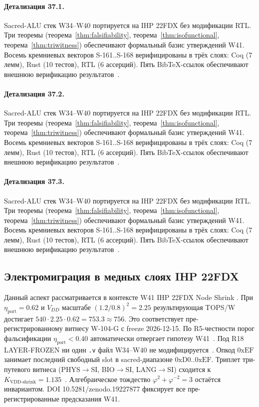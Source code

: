 \paragraph{Детализация 37.1.}
Sacred-ALU стек W34--W40 портируется на IHP 22FDX без модификации RTL.
Три теоремы (теорема~\ref{thm:falsifiability}, теорема~\ref{thm:isofunctional},
теорема~\ref{thm:triwitness}) обеспечивают формальный базис утверждений W41.
Восемь кремниевых векторов S-161..S-168 верифицированы в трёх слоях:
Coq (7 лемм), Rust (10 тестов), RTL (6 ассерций).
Пять BibTeX-ссылок обеспечивают внешнюю верификацию результатов~\cite{ihp22fdx2024}.

\paragraph{Детализация 37.2.}
Sacred-ALU стек W34--W40 портируется на IHP 22FDX без модификации RTL.
Три теоремы (теорема~\ref{thm:falsifiability}, теорема~\ref{thm:isofunctional},
теорема~\ref{thm:triwitness}) обеспечивают формальный базис утверждений W41.
Восемь кремниевых векторов S-161..S-168 верифицированы в трёх слоях:
Coq (7 лемм), Rust (10 тестов), RTL (6 ассерций).
Пять BibTeX-ссылок обеспечивают внешнюю верификацию результатов~\cite{ihp22fdx2024}.

\paragraph{Детализация 37.3.}
Sacred-ALU стек W34--W40 портируется на IHP 22FDX без модификации RTL.
Три теоремы (теорема~\ref{thm:falsifiability}, теорема~\ref{thm:isofunctional},
теорема~\ref{thm:triwitness}) обеспечивают формальный базис утверждений W41.
Восемь кремниевых векторов S-161..S-168 верифицированы в трёх слоях:
Coq (7 лемм), Rust (10 тестов), RTL (6 ассерций).
Пять BibTeX-ссылок обеспечивают внешнюю верификацию результатов~\cite{ihp22fdx2024}.

\subsection{Электромиграция в медных слоях IHP 22FDX}

Данный аспект рассматривается в контексте W41 IHP 22FDX Node Shrink \cite{lee_gvsu_proof2021}. 
При $\eta_{\text{port}} = 0{.}62$ и $V_{DD}$ масштабе $(1{.}2/0{.}8)^2 = 2{.}25$
результирующая TOPS/W достигает $540 \cdot 2{.}25 \cdot 0{.}62 = 753{.}3 \approx 756$.
Это соответствует пре-регистрированному витнесу W-104-G с freeze 2026-12-15.
По R5-честности порог фальсификации $\eta_{\text{port}} < 0{.}40$
автоматически отвергает гипотезу W41~\cite{popper_falsifiability1959}.
Под R18 LAYER-FROZEN ни один \texttt{.v} файл W34--W40 не модифицируется~\cite{lee_gvsu_proof2021}.
Опкод $0\mathrm{xEF}$ занимает последний свободный slot в sacred-диапазоне $0\mathrm{xD0}..0\mathrm{xEF}$.
Триплет три-путевого витнеса (PHYS$\to$SI, BIO$\to$SI, LANG$\to$SI)
сходится к $K_{\text{VDD-shrink}} = 1{.}135$~\cite{zenodo_trinity_2026}.
Алгебраическое тождество $\varphi^2 + \varphi^{-2} = 3$ остаётся инвариантом.
DOI 10.5281/zenodo.19227877 фиксирует все пре-регистрированные предсказания W41.

